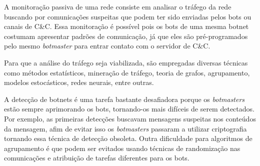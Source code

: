 A monitoração passiva de uma rede consiste em analisar o tráfego da rede buscando por comunicações suspeitas que podem ter sido enviadas pelos bots ou canais de C\&C. Essa monitoração é possível pois os bots de uma mesma botnet costumam apresentar padrões de comunicação, já que eles são pré-programados pelo mesmo \textit{botmaster} para entrar contato com o servidor de C\&C.

Para que a análise do tráfego seja viabilizada, são empregadas diversas técnicas como métodos estatísticos, mineração de tráfego, teoria de grafos, agrupamento, modelos estocásticos, redes neurais, entre outras.

A detecção de botnets é uma tarefa bastante desafiadora porque os \textit{botmasters} estão sempre aprimorando os bots, tornando-os mais difíceis de serem detectados. Por exemplo, as primeiras detecções buscavam mensagens suspeitas nos conteúdos da mensagem, afim de evitar isso os \textit{botmasters} passaram a utilizar criptografia tornando essa técnica de detecção obsoleta. Outra dificuldade para algoritmos de agrupamento é que podem ser evitados usando técnicas de randomização nas comunicações e atribuição de tarefas diferentes para os bots.